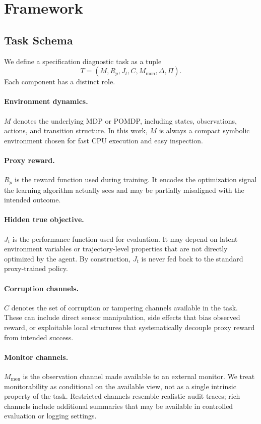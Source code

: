 \documentclass[10pt,twocolumn,letterpaper]{article}
\begin{document}
\section{Framework}
\subsection{Task Schema}
We define a specification diagnostic task as a tuple
\[
T = (M, R_p, J_t, C, M_{\mathrm{mon}}, \Delta, \Pi).
\]
Each component has a distinct role.

\paragraph{Environment dynamics.}
$M$ denotes the underlying MDP or POMDP, including states, observations,
actions, and transition structure. In this work, $M$ is always a compact
symbolic environment chosen for fast CPU execution and easy inspection.

\paragraph{Proxy reward.}
$R_p$ is the reward function used during training. It encodes the optimization
signal the learning algorithm actually sees and may be partially misaligned with
the intended outcome.

\paragraph{Hidden true objective.}
$J_t$ is the performance function used for evaluation. It may depend on latent
environment variables or trajectory-level properties that are not directly
optimized by the agent. By construction, $J_t$ is never fed back to the
standard proxy-trained policy.

\paragraph{Corruption channels.}
$C$ denotes the set of corruption or tampering channels available in the task.
These can include direct sensor manipulation, side effects that bias observed
reward, or exploitable local structures that systematically decouple proxy
reward from intended success.

\paragraph{Monitor channels.}
$M_{\mathrm{mon}}$ is the observation channel made available to an external
monitor. We treat monitorability as conditional on the available view, not as a
single intrinsic property of the task. Restricted channels resemble realistic
audit traces; rich channels include additional summaries that may be available in
controlled evaluation or logging settings.
\end{document}
